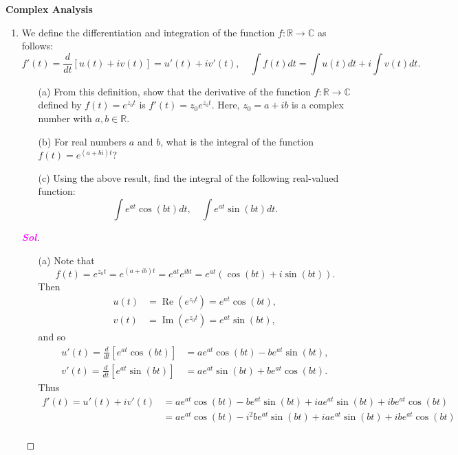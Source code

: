 \documentclass{article}
\theoremstyle{definition}
\newcommand{\of}[1]{\left( #1 \right)}
\newcommand{\sol}{\textcolor{magenta}{\bf Sol}}
\renewcommand{\Re}{\operatorname{Re}}
\renewcommand{\Im}{\operatorname{Im}}
\begin{document}
\begin{center}
	\huge\textbf{Complex Analysis}\\
	\vspace{0.5em}
\end{center}

\begin{enumerate}
	\item We define the differentiation and integration of the function $f : \mathbb{R} \to \mathbb{C}$ as follows: \[
	f'\of{t}=\frac{d}{dt}\left[u\of{t}+iv\of{t}\right] = u'\of{t}+iv'\of{t},\quad
	\int f\of{t}dt = \int u\of{t}dt + i\int v\of{t}dt.
	\] \begin{itemize}
		\item[(a)] From this definition, show that the derivative of the function $f : \mathbb{R} \to \mathbb{C}$ defined by $f(t) = e^{z_0t}$ is $f'(t) = z_0 e^{z_0t}$. Here, $z_0 = a + ib$ is a complex number with $a, b \in \mathbb{R}$.
		\item[(b)] For real numbers $a$ and $b$, what is the integral of the function $f(t) = e^{(a+bi)t}$?
		\item[(c)] Using the above result, find the integral of the following real-valued function: \[
		\int e^{at}\cos\of{bt}dt,\quad \int e^{at}\sin\of{bt}dt.
		\]
	\end{itemize}
	\begin{proof}[\sol]
		\begin{itemize}
			\item[(a)] Note that \[
			f\of{t}=e^{z_0t}=e^{\of{a+ib}t}=e^{at}e^{i bt}=e^{at}\of{\cos\of{bt}+i\sin\of{bt}}.
			\] Then \begin{align*}
				u\of{t} &=\Re\of{e^{z_0t}}=e^{at}\cos\of{bt},\\
				v\of{t} &=\Im\of{e^{z_0t}}=e^{at}\sin\of{bt},
			\end{align*} and so \begin{align*}
				u'\of{t}=\frac{d}{dt}\left[e^{at}\cos\of{bt}\right]&=ae^{at}\cos\of{bt}-be^{at}\sin\of{bt},\\
				v'\of{t}=\frac{d}{dt}\left[e^{at}\sin\of{bt}\right]&=ae^{at}\sin\of{bt}+be^{at}\cos\of{bt}.
			\end{align*} Thus \begin{align*}
				f'\of{t}=u'\of{t}+iv'\of{t}&=ae^{at}\cos\of{bt}-be^{at}\sin\of{bt}+iae^{at}\sin\of{bt}+ibe^{at}\cos\of{bt}\\
				&=ae^{at}\cos\of{bt}-i^2be^{at}\sin\of{bt}+iae^{at}\sin\of{bt}+ibe^{at}\cos\of{bt}\\

\end{align*}
\end{itemize}
\end{proof}
\end{enumerate}
\end{document}
